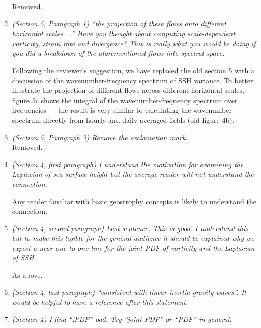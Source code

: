 \documentclass[11pt]{article}
\newcommand{\bdp}{\begin{description}}
\newcommand{\edp}{\end{description}}
\begin{document}
\begin{enumerate}
        Removed.

\item {\it (Section 5, Paragraph 1) ``the projection of these flows onto different horizontal scales
            ...'' Have you thought about computing scale-dependent vorticity, strain rate and
            divergence? This is really what you would be doing if you did a breakdown
            of the aforementioned flows into spectral space.}

            \bdp
                Following the reviewer's suggestion, we have replaced the old section
                5 with a discussion of the wavenumber-frequency spectrum of SSH variance.
                To better illustrate the projection of different flows across
                different horizontal scales, figure 5c shows the integral of the
                wavenumber-frequency spectrum over frequencies --- the result is
                very similar to calculating the wavenumber spectrum directly from
                hourly and daily-averaged fields (old figure 4b).
            \edp

\item {\it (Section 5, Paragraph 3) Remove the exclamation mark.}\\

    Removed.

\item {\it (Section 4, first paragraph) I understand the motivation for examining the Laplacian of
      sea surface height but the average reader will not understand the connection.}

      \bdp
      Any reader familiar with basic geostrophy concepts is likely to understand the connection.
      \edp

\item {\it (Section 4, second paragraph) Last sentence. This is good. I understand this but to
        make this legible for the general audience it should be explained why we expect a near
        one-to-one line for the joint-PDF of vorticity and the Laplacian of SSH.}

      As above.

\item {\it (Section 4, last paragraph) ``consistent with linear inertia-gravity waves''.
        It would be
        helpful to have a reference after this statement.}

\item {\it (Section 4) I find “jPDF” odd. Try “joint-PDF” or “PDF” in general.}\\


\end{enumerate}
\end{document}
